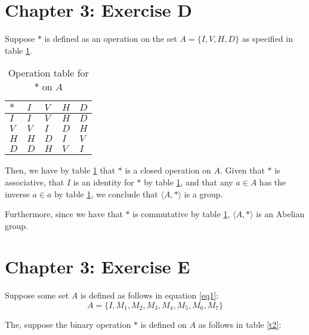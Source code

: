 \documentclass[12pt]{article}
\begin{document}
\section{Chapter 3: Exercise D}

Suppose $*$ is defined as an operation on the set $A = \{ I, V, H, D\}$ as specified in table \ref{t1}.

\begin{table}[!ht] 
\begin{tabular}{l|llll}
$*$ & $I$ & $V$ & $H$ & $D$ \\ \hline
$I$ & $I$ & $V$ & $H$ & $D$ \\
$V$ & $V$ & $I$ & $D$ & $H$ \\
$H$ & $H$ & $D$ & $I$ & $V$ \\
$D$ & $D$ & $H$ & $V$ & $I$ \\
\end{tabular}
\centering
\caption{Operation table for $*$ on $A$}
\label{t1}
\end{table}


Then, we have by table \ref{t1} that $*$ is a closed operation on $A$. Given that $*$ is associative, that $I$ is an identity for $*$ by table \ref{t1}, and that any $a \in A$ has the inverse $a \in a$ by table \ref{t1}, we conclude that $\langle A, * \rangle$ is a group.

Furthermore, since we have that $*$ is commutative by table \ref{t1}, $\langle A, * \rangle$ is an Abelian group.


\section{Chapter 3: Exercise E}

Suppose some set $A$ is defined as follows in equation \ref{eq1}:
\begin{equation}
\label{eq1}
	A = \{ I, M_1, M_2, M_3, M_4, M_5, M_6, M_7 \}
\end{equation}

The, suppose the binary operation $*$ is defined on $A$ as follows in table \ref{t2}:
\end{document}

